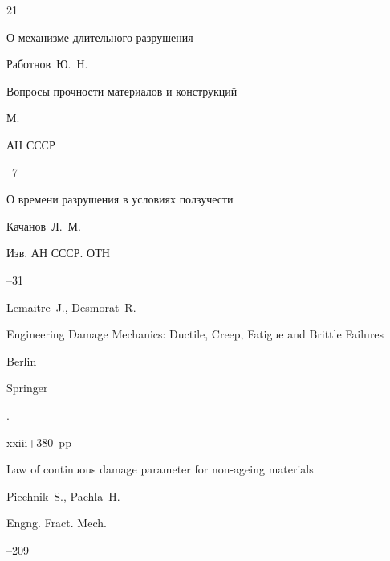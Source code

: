 \RusRef

\begin{thebibliography}{21}




\paper О механизме длительного разрушения

\by Работнов~Ю.~Н.

\inbook Вопросы прочности материалов и конструкций

\publaddr М. 

\publ АН СССР


--7




\paper О времени разрушения в условиях ползучести

\by Качанов~Л.~М.

\jour Изв. АН СССР. ОТН



--31




\by Lemaitre~J., Desmorat~R.

\book Engineering Damage Mechanics: Ductile, Creep, Fatigue and Brittle Failures

\publaddr Berlin

\publ Springer

.


xxiii+380~pp





\paper Law of continuous damage parameter for non-ageing materials

\by Piechnik~S., Pachla~H.

\jour  Engng. Fract. Mech.




--209






\end{thebibliography}

